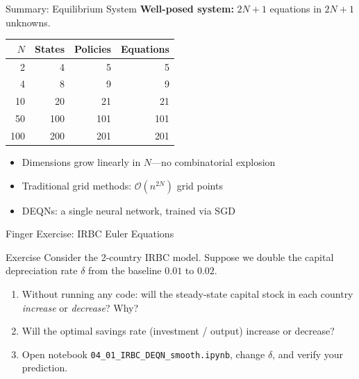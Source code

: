 \documentclass[aspectratio=169,11pt]{beamer}
\newcommand{\emphc}[1]{\textcolor{harvardcrimson}{#1}}
\begin{document}
\begin{frame}{Summary: Equilibrium System}
\textbf{Well-posed system:} $2N+1$ equations in $2N+1$ unknowns.

\vspace{0.5em}
\begin{center}
\begin{tabular}{rrrr}
\toprule
$N$ & \textbf{States} & \textbf{Policies} & \textbf{Equations} \\
\midrule
2 & 4 & 5 & 5 \\
4 & 8 & 9 & 9 \\
10 & 20 & 21 & 21 \\
50 & 100 & 101 & 101 \\
100 & 200 & 201 & 201 \\
\bottomrule
\end{tabular}
\end{center}

\vspace{0.3em}
\begin{itemize}
    \item Dimensions grow \emphc{linearly} in $N$---no combinatorial explosion
    \item Traditional grid methods: $\mathcal{O}(n^{2N})$ grid points
    \item DEQNs: a single neural network, trained via SGD
\end{itemize}
\end{frame}

\begin{frame}{\exercisepause{} Finger Exercise: IRBC Euler Equations}
\begin{exampleblock}{Exercise}
Consider the 2-country IRBC model. Suppose we \emphc{double} the capital depreciation rate $\delta$ from the baseline $0.01$ to $0.02$.
\begin{enumerate}
    \item Without running any code: will the steady-state capital stock in each country \emph{increase} or \emph{decrease}? Why?
    \item Will the optimal savings rate (investment / output) increase or decrease?
    \item Open notebook \texttt{04\_01\_IRBC\_DEQN\_smooth.ipynb}, change $\delta$, and verify your prediction.
\end{enumerate}
\end{exampleblock}
\end{frame}
\end{document}
